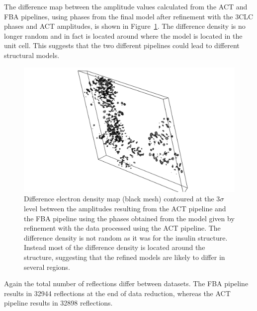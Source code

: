 The difference map between the amplitude values calculated from the ACT and FBA pipelines, using phases from the final model after refinement with the 3CLC phases and ACT amplitudes, is shown in Figure~\ref{fig:Difference electron density map - C.Esp1396I}.
The difference density is no longer random and in fact is located around where the model is located in the unit cell.
This suggests that the two different pipelines could lead to different structural models.
\begin{figure}[ht!]
    \centering
    \includegraphics[width=1.0\textwidth]{figures/datared/CPROT_diff_map.png}
    \caption[Difference electron density map for the C.Esp1396I dataset.]{Difference electron density map (black mesh) contoured at the 3$\sigma$ level between the amplitudes resulting from the ACT pipeline and the FBA pipeline using the phases obtained from the model given by refinement with the data processed using the ACT pipeline.
    The difference density is not random as it was for the insulin structure.
    Instead most of the difference density is located around the structure, suggesting that the refined models are likely to differ in several regions.}
    \label{fig:Difference electron density map - C.Esp1396I}
\end{figure}

Again the total number of reflections differ between datasets.
The FBA pipeline results in 32944 reflections at the end of data reduction, whereas the ACT pipeline results in 32898 reflections.

